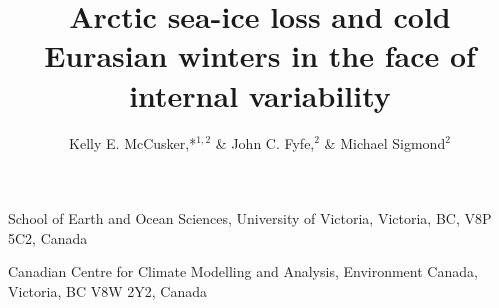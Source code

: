 \documentclass{nature}
\title{Arctic sea-ice loss and cold Eurasian winters in the face of internal variability}%
\author{Kelly E. McCusker,*$^{1,2}$ \& John C. Fyfe,$^{2}$ \& Michael Sigmond$^2$}
\begin{document}
\maketitle

\begin{affiliations}
 \item School of Earth and Ocean Sciences, University of Victoria, Victoria, BC, V8P 5C2, Canada
 \item Canadian Centre for Climate Modelling and Analysis, Environment Canada, Victoria, BC V8W 2Y2, Canada
\end{affiliations}


\begin{abstract}

\end{abstract}
\end{document}
